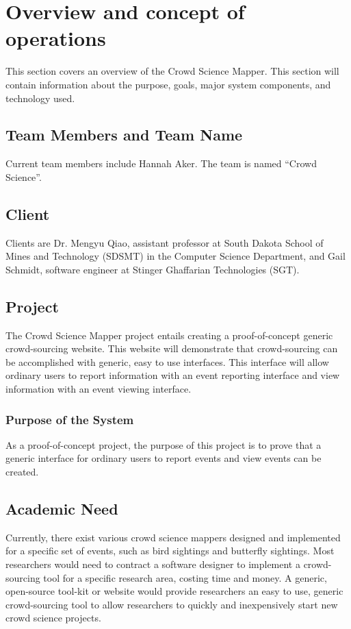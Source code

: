 

\chapter{Overview and concept of operations}

This section covers an overview of the Crowd Science Mapper. This section will contain information about the purpose, goals, major system components, and technology used.

\section{Team Members and Team Name}
Current team members include Hannah Aker. The team is named ``Crowd Science''.

\section{Client}
Clients are Dr. Mengyu Qiao, assistant professor at South Dakota School of Mines and Technology (SDSMT) in the Computer Science Department, and Gail Schmidt, software engineer at Stinger Ghaffarian Technologies (SGT).

\section{Project}
The Crowd Science Mapper project entails creating a proof-of-concept generic crowd-sourcing website. This website will demonstrate that crowd-sourcing can be accomplished with generic, easy to use interfaces. This interface will allow ordinary users to report information with an event reporting interface and view information with an event viewing interface.

\subsection{Purpose of the System}
As a proof-of-concept project, the purpose of this project is to prove that a generic interface for ordinary users to report events and view events can be created.

\section{Academic Need}
Currently, there exist various crowd science mappers designed and implemented for a specific set of events, such as bird sightings and butterfly sightings. Most researchers would need to contract a software designer to implement a crowd-sourcing tool for a specific research area, costing time and money. A generic, open-source tool-kit or website would provide researchers an easy to use, generic crowd-sourcing tool to allow researchers to quickly and inexpensively start new crowd science projects. 

